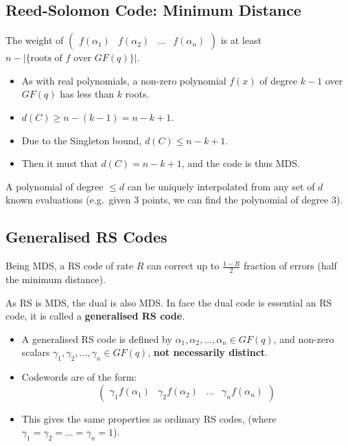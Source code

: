 \documentclass[11pt]{article}
\begin{document}
\subsection{Reed-Solomon Code: Minimum Distance}
The weight of $
  \begin{pmatrix}
    f(\alpha_1) & f(\alpha_2) & \dots & f(\alpha_n)
  \end{pmatrix}
$ is at least $n - \lvert \{ \text{roots of $f$ over $GF(q)$} \} \rvert$.
\begin{itemize}
  \item As with real polynomials, a non-zero polynomial $f(x)$ of degree $k - 1$ over $GF(q)$ has less than $k$ roots.
  \item $d(C) \geq n - (k - 1) = n - k + 1$.
  \item Due to the Singleton bound, $d(C) \leq n - k + 1$.
  \item Then it must that $d(C) = n - k + 1$, and the code is thus MDS.
\end{itemize}

A polynomial of degree $\leq d$ can be uniquely interpolated from any set of $d$ known evaluations (e.g.\ given $3$ points, we can find the polynomial of degree $3$).

\subsection{Generalised RS Codes}
Being MDS, a RS code of rate $R$ can correct up to $\frac{1 - R}{2}$ fraction of errors (half the minimum distance).

As RS is MDS, the dual is also MDS.
In face the dual code is essential an RS code, it is called a \textbf{generalised RS code}.

\begin{itemize}
  \item A generalised RS code is defined by $\alpha_1, \alpha_2, \dots, \alpha_n \in GF(q)$, and non-zero scalars $\gamma_1, \gamma_2, \ldots, \gamma_n \in GF(q)$, \textbf{not necessarily distinct}.
  \item Codewords are of the form:
    \[
      \begin{pmatrix}
        \gamma_1f(\alpha_1) & \gamma_2f(\alpha_2) & \dots & \gamma_nf(\alpha_n)
      \end{pmatrix}
    \]
  \item This gives the same properties as ordinary RS codes, (where $\gamma_1 = \gamma_2 = \ldots = \gamma_n = 1$).
\end{itemize}
\end{document}
